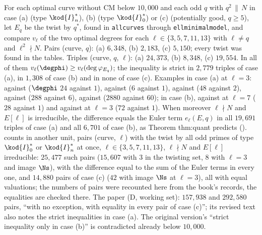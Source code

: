 \begin{sloppypar}
\begin{example}\label{ex:computation:repro-twist}
For each optimal curve without CM below $10{,}000$ and each odd $q$ with $q^2\,\|\,N$ in case (a) (type $\kod{I}_n^*$), (b) (type $\kod{I}_0^*$) or (c) (potentially good, $q\ge5$),
let $E_q$ be the twist by $q^*$, found in \texttt{allcurves} through \texttt{ellminimalmodel}, and compare $v_\ell$ of the two optimal degrees for each
$\ell\in\{3,5,7,11,13\}$ with $\ell\ne q$ and $\ell^2\nmid N$. Pairs (curve, $q$): (a) $6{,}348$, (b) $2{,}183$, (c) $5{,}150$; every twist was found in the tables.
Triples (curve, $q$, $\ell$): (a) $24{,}373$, (b) $8{,}348$, (c) $19{,}554$. In all of them $v_\ell(\degphi)\ge v_\ell(\deg\varphi_{E_q})$; the inequality is strict in $2{,}779$
triples of case (a), in $1{,}308$ of case (b) and in none of case (c). Examples in case (a) at $\ell=3$:  against  ($\degphi$ $24$ against $1$),
 against  ($6$ against $1$),  against  ($48$ against $2$),  against  ($288$ against $6$),
 against  ($2880$ against $60$); in case (b),  against  at $\ell=7$ ($28$ against $1$) and  against  at
$\ell=3$ ($72$ against $1$). When moreover $\ell\nmid N$ and $E[\ell]$ is irreducible, the difference equals the Euler term $e_\ell(E,q)$ in all $19{,}691$ triples of case (a)
and all $6{,}701$ of case (b), as Theorem thm:quant predicts ().  counts in another unit, pairs (curve, $\ell$) with the twist by all
odd primes of type $\kod{I}_0^*$ or $\kod{I}_n^*$ at once, $\ell\in\{3,5,7,11,13\}$, $\ell\nmid N$ and $E[\ell]$ irreducible: $25{,}477$ such pairs ($15{,}607$ with $3$ in
the twisting set, $8$ with $\ell=3$ and image $\Ns$), with the difference equal to the sum of the Euler terms in every one, and $14{,}880$ pairs of case (c)
($42$ with image $\Ns$ at $\ell=3$), all with equal valuations; the numbers of pairs were recounted here from the book's records, the equalities are checked there. The paper (D, working set): $157{,}938$ and $292{,}580$ pairs, ``with no exception,
with equality in every pair of case (c)''; its revised text also notes the strict inequalities in case (a). The original version's ``strict inequality
only in case (b)'' is contradicted already below $10{,}000$.
\end{example}


\end{sloppypar}
